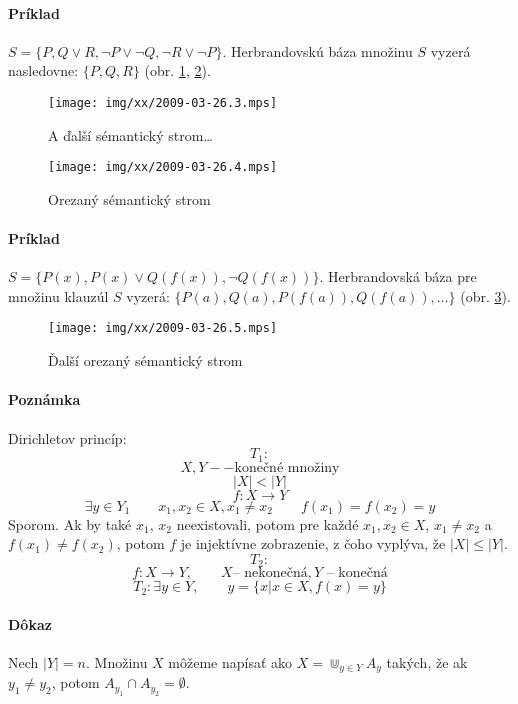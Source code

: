 \paragraph{Príklad} $S= \{ P, Q \lor R, \neg P \lor \neg Q, \neg R \lor \neg P
\}$. Herbrandovskú báza množinu $S$ vyzerá nasledovne: $\{P, Q, R\}$ (obr.
\ref{0326_tree3}, \ref{0326_tree_cut}).

\begin{figure}[h]
	\centering\texttt{[image: img/xx/2009-03-26.3.mps]}
	\caption{A ďalší sémantický strom\ldots}
	\label{0326_tree3}
\end{figure}

\begin{figure}[h]
	\centering\texttt{[image: img/xx/2009-03-26.4.mps]}
	\caption{Orezaný sémantický strom}
	\label{0326_tree_cut}
\end{figure}


\paragraph{Príklad} $S=\{ P(x), P(x) \lor Q(f(x)), \neg Q(f(x)) \}$.
Herbrandovská báza pre množinu klauzúl $S$ vyzerá: $\{ P(a), Q(a), P(f(a)),
Q(f(a)), \ldots \}$ (obr. \ref{0326_tree_cut2}). %


\begin{figure}[h]
	\centering\texttt{[image: img/xx/2009-03-26.5.mps]}
	\caption{Ďalší orezaný sémantický strom}
	\label{0326_tree_cut2}
\end{figure}

\paragraph{Poznámka} Dirichletov princíp:
$$T_1:$$
$$X, Y -- \mbox{konečné množiny}$$
$$ |X| < |Y| $$
$$ f: X \rightarrow Y$$
$$ \exists y \in Y_1\qquad x_1,x_2 \in X, x_1 \neq x_2 \qquad f(x_1) = f(x_2) =
y$$
Sporom. Ak by také $x_1$, $x_2$ neexistovali, potom pre každé $x_1, x_2 \in X$,
$x_1 \neq x_2$ a $f(x_1) \neq f(x_2)$, potom $f$ je injektívne zobrazenie, z
čoho vyplýva, že $|X| \leq |Y|$.
$$T_2: $$
$$ f: X \rightarrow Y,\qquad X\mbox{-- nekonečná}, Y\mbox{ -- konečná} $$
$$T_2: \exists y\in Y, \qquad y=\{x|x\in X, f(x)=y\}$$

\paragraph{Dôkaz} Nech $|Y|=n$. Množinu $X$ môžeme napísať ako $X=\Cup_{y\in
Y}A_y$ takých, že ak $y_1\neq y_2$, potom $A_{y_1} \cap A_{y_2} = \emptyset$.

